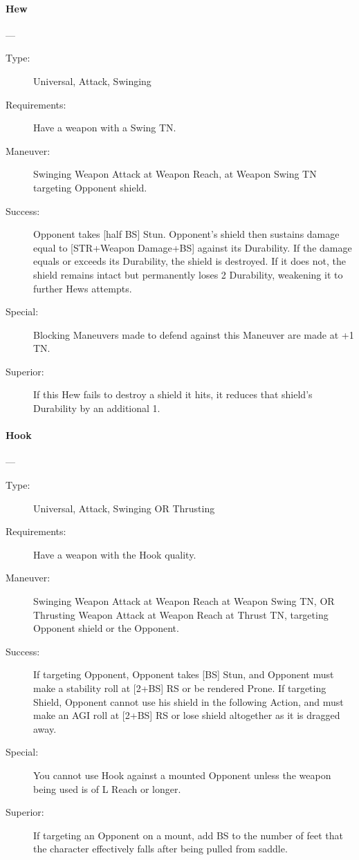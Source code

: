 \documentclass[oneside,11pt,english]{book}
\begin{document}
\paragraph{\large\label{man:Hew}Hew}---\quad{\large[0]}
\vspace{-10pt}\begin{description} 
\item [Type:] Universal, Attack, Swinging 
\item [Requirements:] Have a weapon with a Swing TN. 
\item [Maneuver:] Swinging Weapon Attack at Weapon Reach, at Weapon Swing TN targeting Opponent shield.
\item [Success:] Opponent takes [half BS] Stun. Opponent’s shield then sustains damage equal to [STR+Weapon Damage+BS] against its Durability. If the damage equals or exceeds its Durability, the shield is destroyed. If it does not, the shield remains intact but permanently loses 2 Durability, weakening it to further Hews attempts.
\item [Special:] Blocking Maneuvers made to defend against this Maneuver are made at +1 TN. 
\item [Superior:] If this Hew fails to destroy a shield it hits, it reduces that shield’s Durability by an additional 1. 
\end{description}

\paragraph{\large\label{man:Hook}Hook}---\quad{\large[1]}
\vspace{-10pt}\begin{description} 
\item [Type:] Universal, Attack, Swinging OR Thrusting 
\item [Requirements:] Have a weapon with the Hook quality. 
\item [Maneuver:] Swinging Weapon Attack at Weapon Reach at Weapon Swing TN, OR Thrusting Weapon 
Attack at Weapon Reach at Thrust TN, targeting Opponent shield or the Opponent. 
\item [Success:] If targeting Opponent, Opponent takes [BS] Stun, and Opponent must make a stability roll at 
[2+BS] RS or be rendered Prone. 
If targeting Shield, Opponent cannot use his shield in the following Action, and must make an AGI roll at 
[2+BS] RS or lose shield altogether as it is dragged away. 
\item [Special:] You cannot use Hook against a mounted Opponent unless the weapon being used is of L Reach 
or longer. 
\item [Superior:] If targeting an Opponent on a mount, add BS to the number of feet that the character 
effectively falls after being pulled from saddle. 
\end{description}
\end{document}

